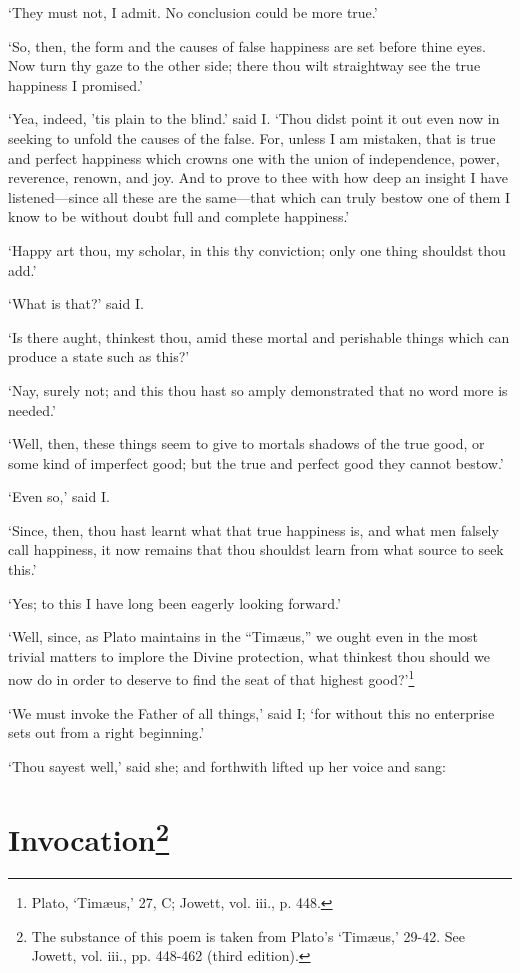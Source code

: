 \documentclass[12pt]{book}
\begin{document}
`They must not, I admit. No conclusion could be more true.'

`So, then, the form and the causes of false happiness are set before
thine eyes. Now turn thy gaze to the other side; there thou wilt
straightway see the true happiness I promised.'

`Yea, indeed, 'tis plain to the blind.' said I. `Thou didst point it out
even now in seeking to unfold the causes of the false. For, unless I am
mistaken, that is true and perfect happiness which crowns one with the
union of independence, power, reverence, renown, and joy. And to prove
to thee with how deep an insight I have listened---since all these are
the same---that which can truly bestow one of them I know to be without
doubt full and complete happiness.'

`Happy art thou, my scholar, in this thy conviction; only one thing
shouldst thou add.'

`What is that?' said I.

`Is there aught, thinkest thou, amid these mortal and perishable things
which can produce a state such as this?'

`Nay, surely not; and this thou hast so amply demonstrated that no word
more is needed.'

`Well, then, these things seem to give to mortals shadows of the true
good, or some kind of imperfect good; but the true and perfect good they
cannot bestow.'

`Even so,' said I.

`Since, then, thou hast learnt what that true happiness is, and what men
falsely call happiness, it now remains that thou shouldst learn from
what source to seek this.'

`Yes; to this I have long been eagerly looking forward.'

`Well, since, as Plato maintains in the ``Timæus,'' we ought even in the
most trivial matters to implore the Divine protection, what thinkest
thou should we now do in order to deserve to find the seat of that
highest good?'\footnote{Plato, `Timæus,’ 27, C; Jowett, vol. iii., p. 448.}

`We must invoke the Father of all things,' said I; `for without this no
enterprise sets out from a right beginning.'

`Thou sayest well,' said she; and forthwith lifted up her voice and
sang:



\section{Invocation\footnote{The substance of this poem is taken from Plato's `Timæus,' 29-42.  See Jowett, vol. iii., pp. 448-462 (third edition).}}
\end{document}
